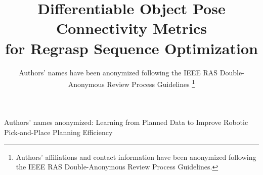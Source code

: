 \documentclass[journal, twoside]{IEEEtran}
\begin{document}
\title{Differentiable Object Pose Connectivity Metrics\\ for Regrasp Sequence Optimization} 


\author{Authors' names have been anonymized following the IEEE RAS Double-Anonymous Review Process Guidelines
\thanks{Authors' affiliations and contact information have been anonymized following the IEEE RAS Double-Anonymous Review Process Guidelines.}}
{Authors' names anonymized: Learning from Planned Data to Improve Robotic Pick-and-Place Planning Efficiency}
\maketitle

\end{document}
